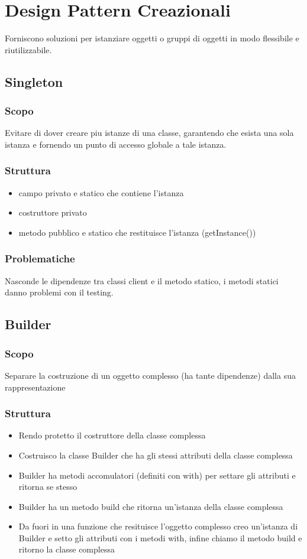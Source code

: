 \section{Design Pattern Creazionali}
Forniscono soluzioni per istanziare oggetti o gruppi di oggetti in modo flessibile e riutilizzabile.

\subsection{Singleton}
\subsubsection{Scopo}
Evitare di dover creare piu istanze di una classe, garantendo che esista una sola istanza e fornendo un punto di accesso globale a tale istanza.
\subsubsection{Struttura}
\begin{itemize}
    \item campo privato e statico che contiene l'istanza
    \item costruttore privato
    \item metodo pubblico e statico che restituisce l'istanza (getInstance())
\end{itemize}
\subsubsection{Problematiche}
Nasconde le dipendenze tra classi client e il metodo statico, i metodi statici danno problemi con il testing. 

\subsection{Builder}
\subsubsection{Scopo}
Separare la costruzione di un oggetto complesso (ha tante dipendenze) dalla sua rappresentazione
\subsubsection{Struttura}
\begin{itemize}
    \item Rendo protetto il costruttore della classe complessa
    \item Costruisco la classe Builder che ha gli stessi attributi della classe complessa
    \item Builder ha metodi accomulatori (definiti con with) per settare gli attributi e ritorna se stesso
    \item Builder ha un metodo build che ritorna un'istanza della classe complessa
    \item Da fuori in una funzione che resituisce l'oggetto complesso creo un'istanza di Builder e setto gli attributi con i metodi with, infine chiamo il metodo build e ritorno la classe complessa
\end{itemize}
